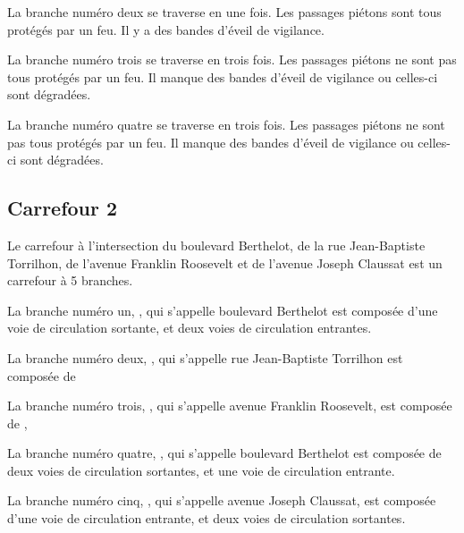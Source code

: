 \begin{appendix}
\newpar{}

La branche numéro deux se traverse en une fois. Les passages piétons sont tous protégés par un feu. Il y a des bandes d'éveil de vigilance.

\newpar{}

La branche numéro trois se traverse en trois fois. Les passages piétons ne sont pas tous protégés par un feu. Il manque des bandes d'éveil de vigilance ou celles-ci sont dégradées.

\newpar{}

La branche numéro quatre se traverse en trois fois. Les passages piétons ne sont pas tous protégés par un feu. Il manque des bandes d'éveil de vigilance ou celles-ci sont dégradées.

\subsection*{Carrefour 2}

\label{annexe:q_ID56_carrefour2}

Le carrefour à l'intersection du boulevard Berthelot, de la rue Jean-Baptiste Torrilhon, de l'avenue Franklin Roosevelt et de l'avenue Joseph Claussat est un carrefour à 5 branches.

\newpar{}

La branche numéro un, , qui s'appelle boulevard Berthelot est composée d'une voie de circulation sortante, et deux voies de circulation entrantes.

\newpar{}

La branche numéro deux, , qui s'appelle rue Jean-Baptiste Torrilhon est composée de 

\newpar{}

La branche numéro trois, , qui s'appelle avenue Franklin Roosevelt, est composée de , 

\newpar{}

La branche numéro quatre, , qui s'appelle boulevard Berthelot est composée de deux voies de circulation sortantes, et une voie de circulation entrante.

\newpar{}

La branche numéro cinq, , qui s'appelle avenue Joseph Claussat,  est composée d'une voie de circulation entrante, et deux voies de circulation sortantes.

\newpar{}



\end{appendix}
